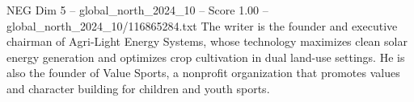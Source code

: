 \begin{textsample}{NEG Dim 5 – global\_north\_2024\_10 – Score 1.00 – global\_north\_2024\_10/116865284.txt}
The writer is the founder and executive chairman of Agri-Light Energy Systems, whose technology maximizes clean solar energy generation and optimizes crop cultivation in dual land-use settings.
He is also the founder of Value Sports, a nonprofit organization that promotes values and character building for children and youth sports.

\end{textsample}
